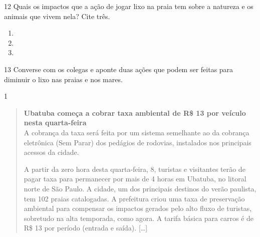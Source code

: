
\num{12} Quais os impactos que a ação de jogar lixo na praia tem sobre a natureza e os animais que vivem nela? Cite três.

\begin{enumerate}
\item {}

\item {}

\item {}
\end{enumerate}


\num{13} Converse com os colegas e aponte duas ações que podem ser feitas para
diminuir o lixo nas praias e nos mares.



\num{1}

\begin{quote}
\textbf{Ubatuba começa a cobrar taxa ambiental de R\$ 13 por veículo
nesta quarta-feira}\\
A cobrança da taxa será feita por um sistema semelhante ao da cobrança
eletrônica (Sem Parar) dos pedágios de rodovias, instalados nos
principais acessos da cidade.

A partir da zero hora desta quarta-feira, 8, turistas e visitantes terão
de pagar taxa para permanecer por mais de 4 horas em Ubatuba, no litoral
norte de São Paulo. A cidade, um dos principais destinos do verão
paulista, tem 102 praias catalogadas. A prefeitura criou uma taxa de
preservação ambiental para compensar os impactos gerados pelo alto fluxo
de turistas, sobretudo na alta temporada, como agora. A tarifa básica
para carros é de R\$ 13 por período (entrada e saída). {[}\ldots{}{]}

\end{quote}

